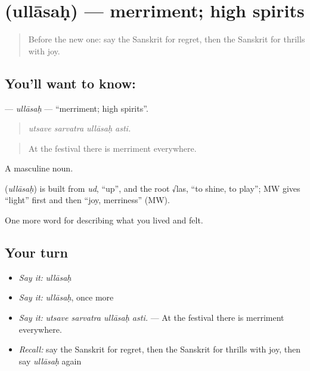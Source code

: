 \section[\texorpdfstring{\sk{उल्लासः} (ullāsaḥ)}{उल्लासः (ullāsaḥ)}]{ (ullāsaḥ) — merriment; high spirits}

\label{lesson:SA-C448-ullasah}



\begin{quote}
Before the new one: say the Sanskrit for regret, then the Sanskrit for thrills with joy.
\end{quote}

\subsection*{You'll want to know: }
\textbf{} — \emph{ullāsaḥ} — \textquotedblleft{}merriment; high spirits\textquotedblright{}.

\begin{quote}
   
\end{quote}

\begin{quote}
\emph{utsave sarvatra ullāsaḥ asti.}
\end{quote}

\begin{quote}
At the festival there is merriment everywhere.
\end{quote}

A masculine noun.

\begin{cousinweb}
\textbf{} (\emph{ullāsaḥ}) is built from \emph{ud}, \textquotedblleft{}up\textquotedblright{}, and the root √las, \textquotedblleft{}to shine, to play\textquotedblright{}; MW gives \textquotedblleft{}light\textquotedblright{} first and then \textquotedblleft{}joy, merriness\textquotedblright{} (MW).
\end{cousinweb}

\begin{grammarlens}[title={What you've built}]
One more word for describing what you lived and felt.
\end{grammarlens}

\subsection*{Your turn}
\begin{itemize}
\raggedright
  \item \emph{Say it:} \emph{ullāsaḥ}
  \item \emph{Say it:} \emph{ullāsaḥ}, once more
  \item \emph{Say it:} \emph{utsave sarvatra ullāsaḥ asti.} — At the festival there is merriment everywhere.
  \item \emph{Recall:} say the Sanskrit for regret, then the Sanskrit for thrills with joy, then say \emph{ullāsaḥ} again
\end{itemize}

